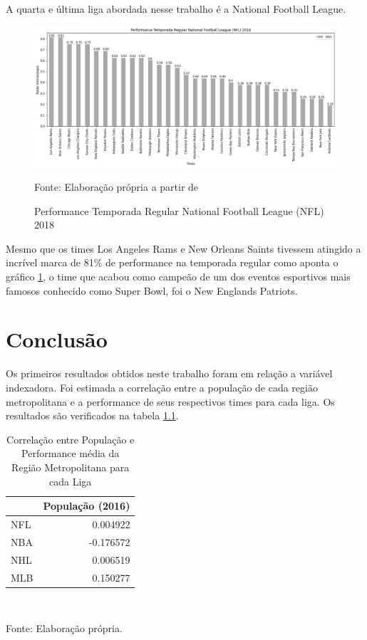 \documentclass[12pt,oneside,a4paper,chapter=TITLE,english,brazil,sumario=abnt-6027-2012]{abntex2}
\begin{document}
	
	A quarta e última liga abordada nesse trabalho é a National Football League. 
	
	\begin{figure}[H]
		\centering
		\caption{Performance Temporada Regular National Football League (NFL) 2018}
		\includegraphics[scale=0.4]{../../output/figures/nfl.png}
		\label{nfl}
		\\ \vspace{0.25cm}
		\raggedright
		\footnotesize{Fonte: Elaboração própria a partir de }
	\end{figure}
	
	Mesmo que os times Los Angeles Rams e New Orleans Saints tivessem atingido a incrível marca de 81\% de performance na temporada regular como aponta o gráfico \ref{nfl}, o time que acabou como campeão de um dos eventos esportivos mais famosos conhecido como Super Bowl, foi o New Englands Patriots.

	
\chapter{Conclusão}

	Os primeiros resultados obtidos neste trabalho foram em relação a variável indexadora. Foi estimada a correlação entre a população de cada região metropolitana e a performance de seus respectivos times para cada liga. Os resultados são verificados na tabela \ref{tab:corr_table}.
	
	\begin{table}[H]
	\centering
	\caption{Correlação entre População e Performance média da Região Metropolitana para cada Liga}
	\begin{tabular}{lr}\hline
	& População (2016) \\\hline
	NFL & 0.004922 \\
	NBA & -0.176572 \\
	NHL & 0.006519 \\
	MLB & 0.150277 \\\hline
	\end{tabular}
	\label{tab:corr_table}
	\\ \vspace{0.25cm}
	\raggedright
	\footnotesize{Fonte: Elaboração própria.}
	\end{table}
\end{document}
